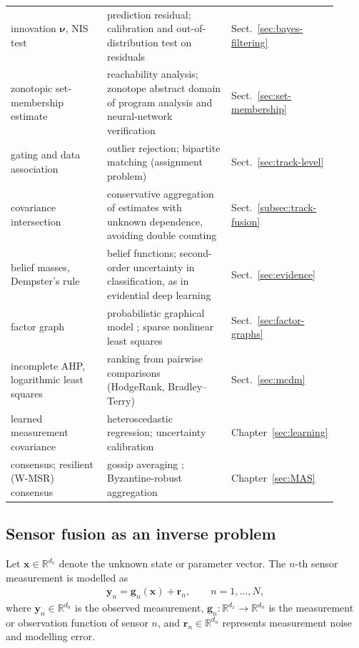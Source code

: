 \begin{addedblock}
\begin{table}[!t]
\begin{tabular}{>{\raggedright\arraybackslash}p{0.33\linewidth} >{\raggedright\arraybackslash}p{0.44\linewidth} >{\raggedright\arraybackslash}p{0.14\linewidth}}
        innovation $\boldsymbol{\nu}$, NIS test & prediction residual; calibration and out-of-distribution test on residuals & Sect.~\ref{sec:bayes-filtering} \\
        zonotopic set-membership estimate & reachability analysis; zonotope abstract domain of program analysis and neural-network verification & Sect.~\ref{sec:set-membership} \\
        gating and data association & outlier rejection; bipartite matching (assignment problem) & Sect.~\ref{sec:track-level} \\
        covariance intersection & conservative aggregation of estimates with unknown dependence, avoiding double counting & Sect.~\ref{subsec:track-fusion} \\
        belief masses, Dempster's rule & belief functions; second-order uncertainty in classification, as in evidential deep learning \cite{sensoy2018_edl} & Sect.~\ref{sec:evidence} \\
        factor graph & probabilistic graphical model \cite{kschischang2001_factor}; sparse nonlinear least squares & Sect.~\ref{sec:factor-graphs} \\
        incomplete AHP, logarithmic least squares & ranking from pairwise comparisons (HodgeRank, Bradley--Terry) & Sect.~\ref{sec:mcdm} \\
        learned measurement covariance & heteroscedastic regression; uncertainty calibration & Chapter~\ref{sec:learning} \\
        consensus; resilient (W-MSR) consensus & gossip averaging \cite{boyd2006_gossip}; Byzantine-robust aggregation & Chapter~\ref{sec:MAS} \\
        \hline
    \end{tabular}
\end{table}
\end{addedblock}






\subsection{Sensor fusion as an inverse problem}
Let $\mathbf{x}\in\mathbb{R}^{d_x}$ denote the unknown state or parameter vector. The $n$-th sensor measurement is modelled as
\begin{align}
\mathbf{y}_n=\mathbf{g}_n(\mathbf{x})+\mathbf{r}_n, \qquad n=1,\ldots,N,
\end{align}
where $\mathbf{y}_n\in\mathbb{R}^{d_n}$ is the observed measurement, $\mathbf{g}_n:\mathbb{R}^{d_x}\rightarrow\mathbb{R}^{d_n}$ is the measurement or observation function of sensor $n$, and $\mathbf{r}_n\in\mathbb{R}^{d_n}$ represents measurement noise and modelling error.

